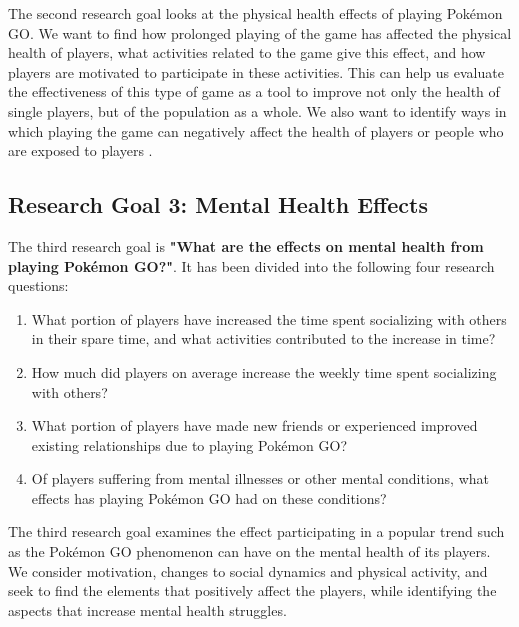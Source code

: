The second research goal looks at the physical health effects of playing Pokémon GO. We want to find how prolonged playing of the game has affected the physical health of players, what activities related to the game give this effect, and how players are motivated to participate in these activities. This can help us evaluate the effectiveness of this type of game as a tool to improve not only the health of single players, but of the population as a whole. We also want to identify ways in which playing the game can negatively affect the health of players or people who are exposed to players .

\subsection{Research Goal 3: Mental Health Effects}

The third research goal is \textbf{"What are the effects on mental health from playing Pokémon GO?"}. It has been divided into the following four research questions:

\begin{enumerate}
	\item What portion of players have increased the time spent socializing with others in their spare time, and what activities contributed to the increase in time?
	\item How much did players on average increase the weekly time spent socializing with others?
	\item What portion of players have made new friends or experienced improved existing relationships due to playing Pokémon GO?
	\item Of players suffering from mental illnesses or other mental conditions, what effects has playing Pokémon GO had on these conditions?
\end{enumerate}

The third research goal examines the effect participating in a popular trend such as the Pokémon GO phenomenon can have on the mental health of its players. We consider motivation, changes to social dynamics and physical activity, and seek to find the elements that positively affect the players, while identifying the aspects that increase mental health struggles.